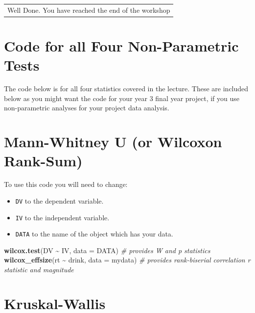 \documentclass[
]{book}
\newenvironment{Shaded}{\begin{snugshade}}{\end{snugshade}}
\newcommand{\AttributeTok}[1]{\textcolor[rgb]{0.13,0.29,0.53}{#1}}
\newcommand{\CommentTok}[1]{\textcolor[rgb]{0.56,0.35,0.01}{\textit{#1}}}
\newcommand{\FunctionTok}[1]{\textcolor[rgb]{0.13,0.29,0.53}{\textbf{#1}}}
\newcommand{\NormalTok}[1]{#1}
\newcommand{\SpecialCharTok}[1]{\textcolor[rgb]{0.81,0.36,0.00}{\textbf{#1}}}
\providecommand{\tightlist}{%
  \setlength{\itemsep}{0pt}\setlength{\parskip}{0pt}}
\let\oldsection\section
\renewcommand{\section}{\needspace{5\baselineskip}\oldsection}
\begin{document}
\begin{longtable}[]{@{}l@{}}
\toprule\noalign{}
\endhead
\bottomrule\noalign{}
\endlastfoot
Well Done. You have reached the end of the workshop \\
\end{longtable}

\section{Code for all Four Non-Parametric Tests}\label{code-for-all-four-non-parametric-tests}

The code below is for all four statistics covered in the lecture. These are included below as you might want the code for your year 3 final year project, if you use non-parametric analyses for your project data analysis.

\section{Mann-Whitney U (or Wilcoxon Rank-Sum)}\label{mann-whitney-u-or-wilcoxon-rank-sum}

To use this code you will need to change:

\begin{itemize}
\tightlist
\item
  \texttt{DV} to the dependent variable.
\item
  \texttt{IV} to the independent variable.
\item
  \texttt{DATA} to the name of the object which has your data.
\end{itemize}

\begin{Shaded}
\begin{Highlighting}[]
\FunctionTok{wilcox.test}\NormalTok{(DV }\SpecialCharTok{\textasciitilde{}}\NormalTok{ IV, }\AttributeTok{data =}\NormalTok{ DATA) }\CommentTok{\# provides W and p statistics}
\FunctionTok{wilcox\_effsize}\NormalTok{(rt }\SpecialCharTok{\textasciitilde{}}\NormalTok{ drink, }\AttributeTok{data =}\NormalTok{ mydata) }\CommentTok{\# provides rank{-}biserial correlation r statistic and magnitude}
\end{Highlighting}
\end{Shaded}

\section{Kruskal-Wallis}\label{kruskal-wallis}
\end{document}
